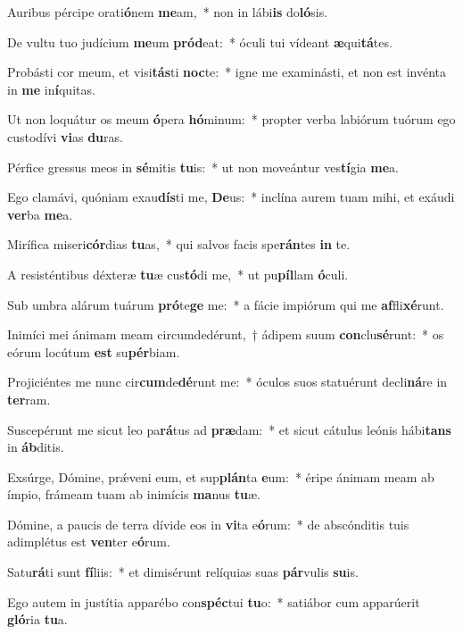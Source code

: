 \item Auribus pércipe orati\textbf{ó}nem \textbf{me}am,~* non in lábi\textbf{is} do\textbf{ló}sis.
\item De vultu tuo judícium \textbf{me}um \textbf{pród}eat:~* óculi tui vídeant \textbf{æ}qui\textbf{tá}tes.
\item Probásti cor meum, et visi\textbf{tás}ti \textbf{noc}te:~* igne me examinásti, et non est invénta in \textbf{me} in\textbf{í}quitas.
\item Ut non loquátur os meum \textbf{ó}pera \textbf{hó}minum:~* propter verba labiórum tuórum ego custodívi \textbf{vi}as \textbf{du}ras.
\item Pérfice gressus meos in \textbf{sé}mitis \textbf{tu}is:~* ut non moveántur ves\textbf{tí}gia \textbf{me}a.
\item Ego clamávi, quóniam exau\textbf{dís}ti me, \textbf{De}us:~* inclína aurem tuam mihi, et exáudi \textbf{ver}ba \textbf{me}a.
\item Mirífica miseri\textbf{cór}dias \textbf{tu}as,~* qui salvos facis spe\textbf{rán}tes \textbf{in} te.
\item A resisténtibus déxteræ \textbf{tu}æ cus\textbf{tó}di me,~* ut pu\textbf{píl}lam \textbf{ó}culi.
\item Sub umbra alárum tuárum \textbf{pró}te\textbf{ge} me:~* a fácie impiórum qui me \textbf{af}fli\textbf{xé}runt.
\item Inimíci mei ánimam meam circumdedérunt,~† ádipem suum \textbf{con}clu\textbf{sé}runt:~* os eórum locútum \textbf{est} su\textbf{pér}biam.
\item Projiciéntes me nunc cir\textbf{cum}de\textbf{dé}runt me:~* óculos suos statuérunt decli\textbf{ná}re in \textbf{ter}ram.
\item Suscepérunt me sicut leo pa\textbf{rá}tus ad \textbf{præ}dam:~* et sicut cátulus leónis hábi\textbf{tans} in \textbf{áb}ditis.
\item Exsúrge, Dómine, prǽveni eum, et sup\textbf{plán}ta \textbf{e}um:~* éripe ánimam meam ab ímpio, frámeam tuam ab inimícis \textbf{ma}nus \textbf{tu}æ.
\item Dómine, a paucis de terra dívide eos in \textbf{vi}ta e\textbf{ó}rum:~* de abscónditis tuis adimplétus est \textbf{ven}ter e\textbf{ó}rum.
\item Satu\textbf{rá}ti sunt \textbf{fí}liis:~* et dimisérunt relíquias suas \textbf{pár}vulis \textbf{su}is.
\item Ego autem in justítia apparébo con\textbf{spéc}tui \textbf{tu}o:~* satiábor cum apparúerit \textbf{gló}ria \textbf{tu}a.
